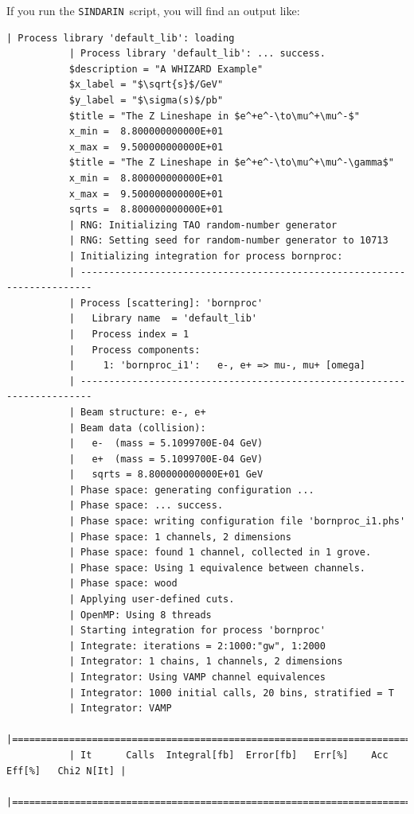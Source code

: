 \documentclass[12pt]{book}
\newcommand{\ttt}[1]{\texttt{#1}}
\newcommand{\sindarin}{\ttt{SINDARIN}}
\begin{document}
If you run the \sindarin\ script, you will find an output like:
\begin{scriptsize}
\begin{Verbatim}[frame=single]
           | Process library 'default_lib': loading
           | Process library 'default_lib': ... success.
           $description = "A WHIZARD Example"
           $x_label = "$\sqrt{s}$/GeV"
           $y_label = "$\sigma(s)$/pb"
           $title = "The Z Lineshape in $e^+e^-\to\mu^+\mu^-$"
           x_min =  8.800000000000E+01
           x_max =  9.500000000000E+01
           $title = "The Z Lineshape in $e^+e^-\to\mu^+\mu^-\gamma$"
           x_min =  8.800000000000E+01
           x_max =  9.500000000000E+01
           sqrts =  8.800000000000E+01
           | RNG: Initializing TAO random-number generator
           | RNG: Setting seed for random-number generator to 10713
           | Initializing integration for process bornproc:
           | ------------------------------------------------------------------------
           | Process [scattering]: 'bornproc'
           |   Library name  = 'default_lib'
           |   Process index = 1
           |   Process components:
           |     1: 'bornproc_i1':   e-, e+ => mu-, mu+ [omega]
           | ------------------------------------------------------------------------
           | Beam structure: e-, e+
           | Beam data (collision):
           |   e-  (mass = 5.1099700E-04 GeV)
           |   e+  (mass = 5.1099700E-04 GeV)
           |   sqrts = 8.800000000000E+01 GeV
           | Phase space: generating configuration ...
           | Phase space: ... success.
           | Phase space: writing configuration file 'bornproc_i1.phs'
           | Phase space: 1 channels, 2 dimensions
           | Phase space: found 1 channel, collected in 1 grove.
           | Phase space: Using 1 equivalence between channels.
           | Phase space: wood
           | Applying user-defined cuts.
           | OpenMP: Using 8 threads
           | Starting integration for process 'bornproc'
           | Integrate: iterations = 2:1000:"gw", 1:2000
           | Integrator: 1 chains, 1 channels, 2 dimensions
           | Integrator: Using VAMP channel equivalences
           | Integrator: 1000 initial calls, 20 bins, stratified = T
           | Integrator: VAMP
           |=============================================================================|
           | It      Calls  Integral[fb]  Error[fb]   Err[%]    Acc  Eff[%]   Chi2 N[It] |
           |=============================================================================|

\end{Verbatim}
\end{scriptsize}
\end{document}
